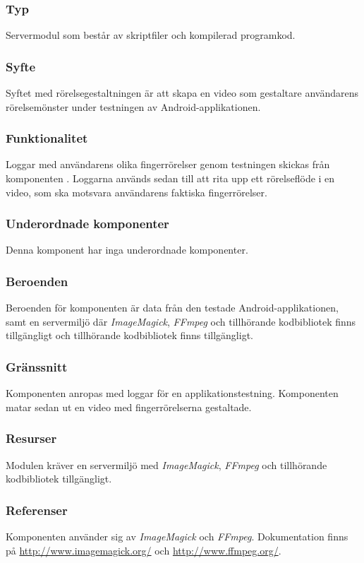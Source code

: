 \subsubsection{Typ}
Servermodul som består av skriptfiler och kompilerad programkod.

\subsubsection{Syfte}
Syftet med rörelsegestaltningen är att skapa en video som gestaltare användarens rörelsemönster under testningen av Android-applikationen.

\subsubsection{Funktionalitet}
Loggar med användarens olika fingerrörelser genom testningen skickas från komponenten . Loggarna används sedan till att rita upp ett rörelseflöde i en video, som ska motsvara användarens faktiska fingerrörelser.

\subsubsection{Underordnade komponenter}
Denna komponent har inga underordnade komponenter.

\subsubsection{Beroenden}
Beroenden för komponenten är data från den testade Android-applikationen, samt en servermiljö där \textit{ImageMagick}, \textit{FFmpeg} och tillhörande kodbibliotek finns tillgängligt och tillhörande kodbibliotek finns tillgängligt.

\subsubsection{Gränssnitt}
Komponenten anropas med loggar för en applikationstestning. Komponenten matar sedan ut en video med fingerrörelserna gestaltade.

\subsubsection{Resurser}
Modulen kräver en servermiljö med \textit{ImageMagick}, \textit{FFmpeg} och tillhörande kodbibliotek tillgängligt.

\subsubsection{Referenser}
Komponenten använder sig av \textit{ImageMagick} och \textit{FFmpeg}. Dokumentation finns på \url{http://www.imagemagick.org/} och \url{http://www.ffmpeg.org/}.

